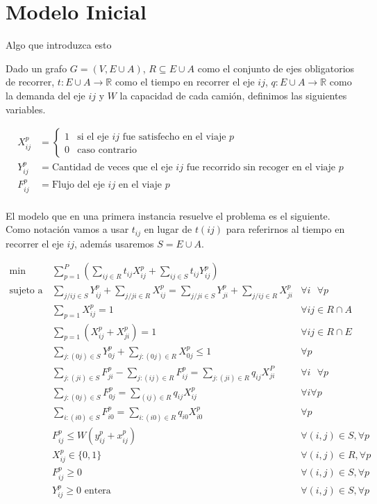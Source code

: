 \section{Modelo Inicial}

Algo que introduzca esto

\vspace{3mm}

Dado un grafo $G = (V,E\cup A)$, $R \subseteq E\cup A$ como el conjunto de ejes obligatorios de recorrer,  
$t:E\cup A\rightarrow \mathbb{R}$ como el tiempo en recorrer el eje $ij$, $q:E\cup A\rightarrow \mathbb{R}$ 
como la demanda del eje $ij$ y $W$ la capacidad de cada camión, definimos las siguientes variables.

\begin{align*}
    X^p_{ij} &= 
    \begin{cases}
        1 & \text{si el eje } ij \text{ fue satisfecho en el viaje } p \\
        0 & \text{caso contrario}
    \end{cases} \\
    Y^p_{ij} &= \text{Cantidad de veces que el eje } ij \text{ fue recorrido sin recoger en el viaje } p \\
    F^p_{ij} &= \text{Flujo del eje } ij \text{ en el viaje } p \\
\end{align*}

El modelo que en una primera instancia resuelve el problema es el siguiente. Como notación vamos a usar $t_{ij}$ 
en lugar de $t(ij)$ para referirnos al tiempo en recorrer el eje $ij$, además usaremos $S = E\cup A$.

\begin{align}
    \min \quad & \sum^P_{p=1}(\sum_{ij\in R}t_{ij}X^p_{ij} + \sum_{ij\in S}t_{ij}Y^p_{ij}) \\
    \text{sujeto a} \quad & \sum_{j/ij\in S} Y^p_{ij} + \sum_{j/ji\in R} X^p_{ij} = \sum_{j/ji\in S} Y^p_{ji} + \sum_{j/ij\in R} X^p_{ji} & \forall i \text{ } \forall p \\
    & \sum_{p=1} X_{ij}^p = 1 & \forall ij \in R \cap A \\
    & \sum_{p=1} (X_{ij}^p + X_{ji}^p) = 1 & \forall ij \in R \cap E \\
    & \sum_{j:(0j)\in S} Y^p_{0j} + \sum_{j:(0j)\in R} X^p_{0j} \leq 1 & \forall p \\
    & \sum_{j:(ji)\in S} F^p_{ji} - \sum_{j:(ij)\in R} F^p_{ij} = \sum_{j:(ji)\in R}q_{ij} X_{ji}^P & \forall i \text{ } \forall p \\
    & \sum_{j:(0j) \in S} F^p_{0j} = \sum_{(ij)\in R} q_{ij}X_{ij}^p & \forall i \forall p \\
    & \sum_{i:(i0) \in S} F^p_{i0} = \sum_{i:(i0)\in R} q_{i0}X_{i0}^p & \forall p \\
    & F^p_{ij} \leq W(y^p_{ij} + x^p_{ij}) & \forall(i,j) \in S, \forall p \\
    & X^p_{ij} \in \{0,1\} & \forall(i,j) \in R, \forall p \\
    & F^p_{ij} \geq 0 & \forall(i,j) \in S, \forall p \\
    & Y^p_{ij} \geq 0 \text{ entera} & \forall(i,j) \in S, \forall p
\end{align}


